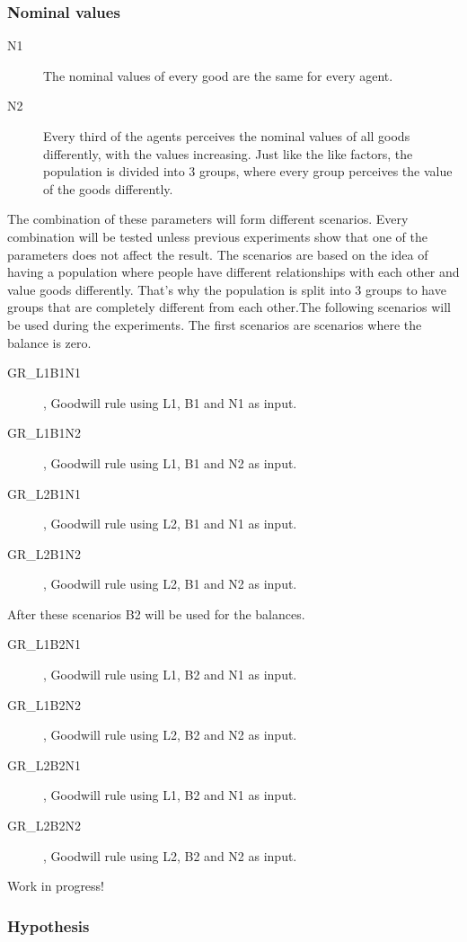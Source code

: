 \documentclass[twoside,openright]{uva-bachelor-thesis}
\begin{document}
\subsubsection{Nominal values}
\begin{description}
\item[N1]	The nominal values of every good are the same for every agent.
\item[N2]	Every third of the agents perceives the nominal values of all goods differently, with the values increasing. Just like the like factors, the population is divided into 3 groups, where every group perceives the value of the goods differently.
\end{description}
The combination of these parameters will form different scenarios. Every combination will be tested unless previous experiments show that one of the parameters does not affect the result. The scenarios are based on the idea of having a population where people have different relationships with each other and value goods differently. That’s why the population is split into 3 groups to have groups that are completely different from each other.The following scenarios will be used during the experiments.
The first scenarios are scenarios where the balance is zero.
\begin{description}
\item[GR\_L1B1N1], Goodwill rule using L1, B1 and N1 as input.
\item[GR\_L1B1N2], Goodwill rule using L1, B1 and N2 as input.
\item[GR\_L2B1N1], Goodwill rule using L2, B1 and N1 as input.
\item[GR\_L2B1N2], Goodwill rule using L2, B1 and N2 as input.
\end{description}
After these scenarios B2 will be used for the balances.
\begin{description}
\item[GR\_L1B2N1], Goodwill rule using L1, B2 and N1 as input.
\item[GR\_L1B2N2], Goodwill rule using L2, B2 and N2 as input.
\item[GR\_L2B2N1], Goodwill rule using L1, B2 and N1 as input.
\item[GR\_L2B2N2], Goodwill rule using L2, B2 and N2 as input.
\end{description}
 Work in progress!

\subsubsection{Hypothesis}
\end{document}
